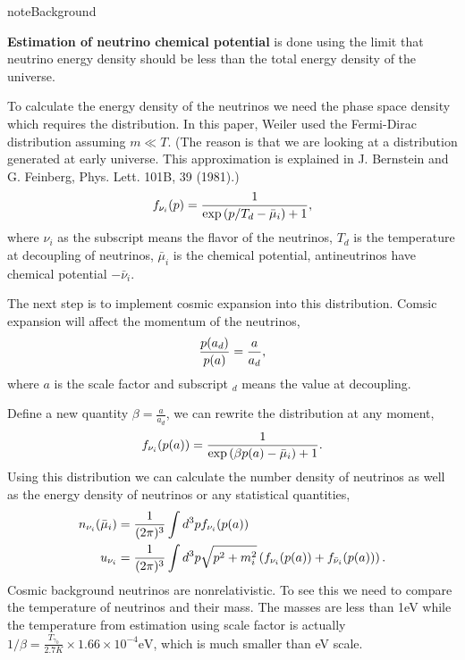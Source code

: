 \documentclass[letterpaper,12pt,english]{sphinxmanual}
\begin{document}
\begin{notice}{note}{Background}

\textbf{Estimation of neutrino chemical potential} is done using the limit that neutrino energy density should be less than the total energy density of the universe.

To calculate the energy density of the neutrinos we need the phase space density which requires the distribution. In this paper, Weiler used the Fermi-Dirac distribution assuming \(m\ll T\). (The reason is that we are looking at a distribution generated at early universe. This approximation is explained in J. Bernstein and G. Feinberg, Phys. Lett. 101B, 39 (1981).)
\begin{gather}
\begin{split}f_{\nu_i}(p) = \frac{1}{ \exp\left( p/T_d - \bar \mu_i \right) +1 },\end{split}\notag
\end{gather}
where \(\nu_i\) as the subscript means the flavor of the neutrinos, \(T_d\) is the temperature at decoupling of neutrinos, \(\bar\mu_i\) is the chemical potential, antineutrinos have chemical potential \(-\bar\nu_i\).

The next step is to implement cosmic expansion into this distribution. Comsic expansion will affect the momentum of the neutrinos,
\begin{gather}
\begin{split}\frac{p(a_d)}{p(a)} = \frac{a}{a_d},\end{split}\notag
\end{gather}
where \(a\) is the scale factor and subscript \({}_d\) means the value at decoupling.

Define a new quantity \(\beta = \frac{a}{a_d}\), we can rewrite the distribution at any moment,
\begin{gather}
\begin{split}f_{\nu_i}(p(a)) = \frac{1}{ \exp\left( \beta p(a) - \bar \mu_i \right) +1 }.\end{split}\notag
\end{gather}
Using this distribution we can calculate the number density of neutrinos as well as the energy density of neutrinos or any statistical quantities,
\begin{gather}
\begin{split}n_{\nu_i} (\bar \mu_i) &= \frac{1}{(2\pi)^3} \int d^3p f_{\nu_i}(p(a)) \\
u_{\nu_i} & = \frac{1}{(2\pi)^3} \int d^3p \sqrt{p^2+m_i^2} \left( f_{\nu_i}(p(a)) + f_{\bar\nu_i}(p(a)) \right).\end{split}\notag
\end{gather}
Cosmic background neutrinos are nonrelativistic. To see this we need to compare the temperature of neutrinos and their mass. The masses are less than 1eV while the temperature from estimation using scale factor is actually \(1/\beta = \frac{T_{\gamma_0}}{2.7K}\times 1.66\times 10^{-4} \mathrm{eV}\), which is much smaller than eV scale. \footnotemark[6]
\end{notice}
\end{document}
